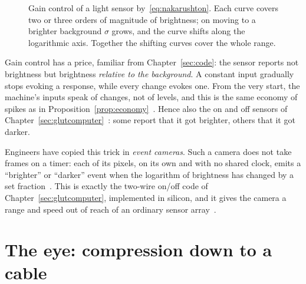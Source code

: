 \begin{figure}[t]
\centering
{}
\caption{Gain control of a light sensor by~\eqref{eq:nakarushton}. Each curve covers two or three orders of magnitude of brightness; on moving to a brighter background $\sigma$ grows, and the curve shifts along the logarithmic axis. Together the shifting curves cover the whole range.}
\label{fig:adaptation}
\end{figure}

Gain control has a price, familiar from Chapter~\ref{sec:code}: the sensor reports not brightness but brightness \emph{relative to the background}. A constant input gradually stops evoking a response, while every change evokes one. From the very start, the machine's inputs speak of changes, not of levels, and this is the same economy of spikes as in Proposition~\ref{prop:economy}~\cite{Barlow1961}. Hence also the on and off sensors of Chapter~\ref{sec:glutcomputer}~\cite{Schiller1992}: some report that it got brighter, others that it got darker.

Engineers have copied this trick in \emph{event cameras}. Such a camera does not take frames on a timer: each of its pixels, on its own and with no shared clock, emits a ``brighter'' or ``darker'' event when the logarithm of brightness has changed by a set fraction~\cite{Lichtsteiner2008}. This is exactly the two-wire on/off code of Chapter~\ref{sec:glutcomputer}, implemented in silicon, and it gives the camera a range and speed out of reach of an ordinary sensor array~\cite{Gallego2022}.

\section{The eye: compression down to a cable}

